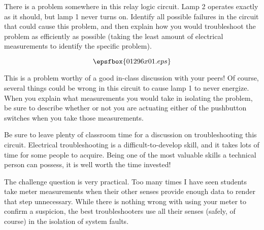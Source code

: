 

There is a problem somewhere in this relay logic circuit.  Lamp 2 operates exactly as it should, but lamp 1 never turns on.  Identify all possible failures in the circuit that could cause this problem, and then explain how you would troubleshoot the problem as efficiently as possible (taking the least amount of electrical measurements to identify the specific problem).

$$\epsfbox{01296x01.eps}$$







This is a problem worthy of a good in-class discussion with your peers!  Of course, several things could be wrong in this circuit to cause lamp 1 to never energize.  When you explain what measurements you would take in isolating the problem, be sure to describe whether or not you are actuating either of the pushbutton switches when you take those measurements. 







Be sure to leave plenty of classroom time for a discussion on troubleshooting this circuit.  Electrical troubleshooting is a difficult-to-develop skill, and it takes lots of time for some people to acquire.  Being one of the most valuable skills a technical person can possess, it is well worth the time invested!

The challenge question is very practical.  Too many times I have seen students take meter measurements when their other senses provide enough data to render that step unnecessary.  While there is nothing wrong with using your meter to confirm a suspicion, the best troubleshooters use all their senses (safely, of course) in the isolation of system faults.




